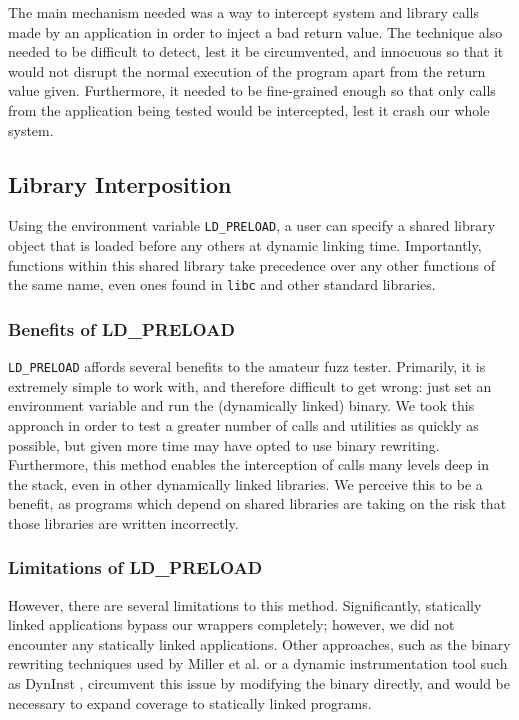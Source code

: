 The main mechanism needed was a way to intercept system and library calls made by an application in order to inject a bad return value. The technique also needed to be difficult to detect, lest it be circumvented, and innocuous so that it would not disrupt the normal execution of the program apart from the return value given. Furthermore, it needed to be fine-grained enough so that only calls from the  application being tested would be intercepted, lest it crash our whole system.

\subsection{Library Interposition}
Using the environment variable \texttt{LD\_PRELOAD}, a user can specify a shared library object that is loaded before any others at dynamic linking time. Importantly, functions within this shared library take precedence over any other functions of the same name, even ones found in \texttt{libc} and other standard libraries.

\subsubsection{Benefits of LD\_PRELOAD}
\texttt{LD\_PRELOAD} affords several benefits to the amateur fuzz tester. Primarily, it is extremely simple to work with, and therefore difficult to get wrong: just set an environment variable and run the (dynamically linked) binary. We took this approach in order to test a greater number of calls and utilities as quickly as possible, but given more time may have opted to use binary rewriting. Furthermore, this method enables the interception of calls many levels deep in the stack, even in other dynamically linked libraries. We perceive this to be a benefit, as programs which depend on shared libraries are taking on the risk that those libraries are written incorrectly.

\subsubsection{Limitations of LD\_PRELOAD}
However, there are several limitations to this method. Significantly, statically linked applications bypass our wrappers completely; however, we did not encounter any statically linked applications. Other approaches, such as the binary rewriting techniques used by Miller et al. \cite{bart} or a dynamic instrumentation tool such as DynInst \cite{dyninst}, circumvent this issue by modifying the binary directly, and would be necessary to expand coverage to statically linked programs.

